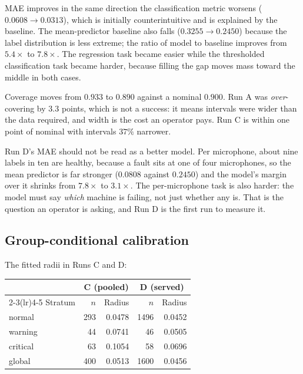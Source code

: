 \documentclass[11pt]{article}
\begin{document}
MAE improves in the same direction the classification metric worsens
($0.0608 \rightarrow 0.0313$), which is initially counterintuitive and is
explained by the baseline. The mean-predictor baseline also falls
($0.3255 \rightarrow 0.2450$) because the label distribution is less extreme;
the ratio of model to baseline improves from $5.4\times$ to $7.8\times$. The
regression task became easier while the thresholded classification task became
harder, because filling the gap moves mass toward the middle in both cases.

Coverage moves from $0.933$ to $0.890$ against a nominal $0.900$. Run A was
\emph{over}-covering by $3.3$ points, which is not a success: it means intervals
were wider than the data required, and width is the cost an operator pays.
Run C is within one point of nominal with intervals $37\%$ narrower.

Run D's MAE should not be read as a better model. Per microphone, about nine
labels in ten are healthy, because a fault sits at one of four microphones, so
the mean predictor is far stronger ($0.0808$ against $0.2450$) and the model's
margin over it shrinks from $7.8\times$ to $3.1\times$. The per-microphone task
is also harder: the model must say \emph{which} machine is failing, not just
whether any is. That is the question an operator is asking, and Run D is the
first run to measure it.

\subsection{Group-conditional calibration}

The fitted radii in Runs C and D:

\begin{center}
\begin{tabular}{lrrrr}
\toprule
& \multicolumn{2}{c}{\textbf{C} (pooled)} & \multicolumn{2}{c}{\textbf{D} (served)} \\
\cmidrule(lr){2-3}\cmidrule(lr){4-5}
Stratum & $n$ & Radius & $n$ & Radius \\
\midrule
normal   & 293 & 0.0478 & 1496 & 0.0452 \\
warning  &  44 & 0.0741 &   46 & 0.0505 \\
critical &  63 & 0.1054 &   58 & 0.0696 \\
\midrule
global   & 400 & 0.0513 & 1600 & 0.0456 \\
\bottomrule
\end{tabular}
\end{center}
\end{document}
